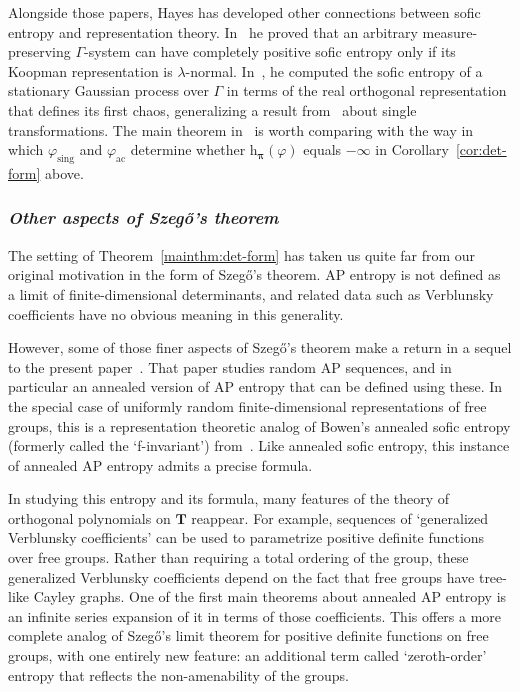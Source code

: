 \documentclass[12pt,a4paper]{article}
\numberwithin{equation}{section}
\theoremstyle{remark}
\renewcommand{\rm}[1]{\mathrm{#1}}
\newcommand{\bbT}{\mathbf{T}}
\newcommand{\rmh}{\mathrm{h}}
\newcommand{\G}{\Gamma}
\renewcommand{\phi}{\varphi}
\renewcommand{\l}{\lambda}
\newcommand{\bspi}{\boldsymbol{\pi}}
\begin{document}
Alongside those papers, Hayes has developed other connections between sofic entropy and representation theory.  In~\cite{Hayes18} he proved that an arbitrary measure-preserving $\G$-system can have completely positive sofic entropy only if its Koopman representation is $\l$-normal.  In~\cite{Hayes17}, he computed the sofic entropy of a stationary Gaussian process over $\G$ in terms of the real orthogonal representation that defines its first chaos, generalizing a result from~\cite{HamParTho08} about single transformations.  The main theorem in~\cite{Hayes17} is worth comparing with the way in which $\phi_{\rm{sing}}$ and $\phi_{\rm{ac}}$ determine whether $\rmh_{\bspi}(\phi)$ equals $-\infty$ in Corollary~\ref{cor:det-form} above.


\subsubsection*{\emph{Other aspects of Szeg\H{o}'s theorem}}

The setting of Theorem~\ref{mainthm:det-form} has taken us quite far from our original motivation in the form of Szeg\H{o}'s theorem.  AP entropy is not defined as a limit of finite-dimensional determinants, and related data such as Verblunsky coefficients have no obvious meaning in this generality.

However, some of those finer aspects of Szeg\H{o}'s theorem make a return in a sequel to the present paper~\cite{APE4b}.  That paper studies random AP sequences, and in particular an annealed version of AP entropy that can be defined using these.  In the special case of uniformly random finite-dimensional representations of free groups, this is a representation theoretic analog of Bowen's annealed sofic entropy (formerly called the `f-invariant') from~\cite{Bowen10free,Bowen10c}.  Like annealed sofic entropy, this instance of annealed AP entropy admits a precise formula.

In studying this entropy and its formula, many features of the theory of orthogonal polynomials on $\bbT$ reappear.  For example, sequences of `generalized Verblunsky coefficients' can be used to parametrize positive definite functions over free groups.  Rather than requiring a total ordering of the group, these generalized Verblunsky coefficients depend on the fact that free groups have tree-like Cayley graphs.  One of the first main theorems about annealed AP entropy is an infinite series expansion of it in terms of those coefficients.  This offers a more complete analog of Szeg\H{o}'s limit theorem for positive definite functions on free groups, with one entirely new feature: an additional term called `zeroth-order' entropy that reflects the non-amenability of the groups.
\end{document}
